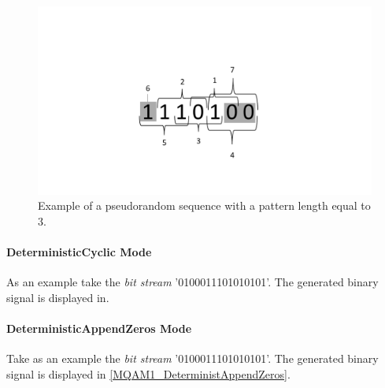 \begin{figure}[h]
	\centering
\includegraphics[width=\textwidth]{./lib/binary_source/figures/BinarySequenceN3.pdf}
\caption{Example of a pseudorandom sequence with a pattern length equal to 3.}\label{BinarySequenceN3}
\end{figure}

\paragraph*{DeterministicCyclic Mode}

As an example take the \textit{bit stream} '0100011101010101'. The generated binary signal is displayed in.

\paragraph*{DeterministicAppendZeros Mode}

Take as an example the \textit{bit stream} '0100011101010101'. The generated binary signal is displayed in \ref{MQAM1_DeterministAppendZeros}.

